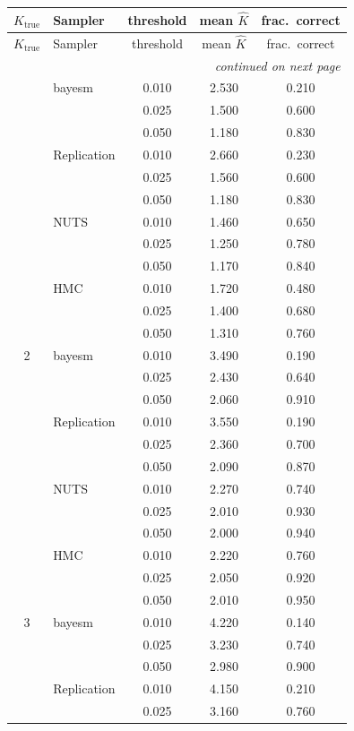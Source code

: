 \begin{longtable}{clccc}
\toprule
$K_{\text{true}}$ & Sampler & threshold & mean $\hat K$ & frac.\ correct \\
\midrule
\endfirsthead
\toprule
$K_{\text{true}}$ & Sampler & threshold & mean $\hat K$ & frac.\ correct \\
\midrule
\endhead
\midrule
\multicolumn{5}{r}{\emph{continued on next page}} \\
\endfoot
\bottomrule
\endlastfoot
1 & bayesm & 0.010 & 2.530 & 0.210 \\
 &  & 0.025 & 1.500 & 0.600 \\
 &  & 0.050 & 1.180 & 0.830 \\
 & Replication & 0.010 & 2.660 & 0.230 \\
 &  & 0.025 & 1.560 & 0.600 \\
 &  & 0.050 & 1.180 & 0.830 \\
 & NUTS & 0.010 & 1.460 & 0.650 \\
 &  & 0.025 & 1.250 & 0.780 \\
 &  & 0.050 & 1.170 & 0.840 \\
 & HMC & 0.010 & 1.720 & 0.480 \\
 &  & 0.025 & 1.400 & 0.680 \\
 &  & 0.050 & 1.310 & 0.760 \\
2 & bayesm & 0.010 & 3.490 & 0.190 \\
 &  & 0.025 & 2.430 & 0.640 \\
 &  & 0.050 & 2.060 & 0.910 \\
 & Replication & 0.010 & 3.550 & 0.190 \\
 &  & 0.025 & 2.360 & 0.700 \\
 &  & 0.050 & 2.090 & 0.870 \\
 & NUTS & 0.010 & 2.270 & 0.740 \\
 &  & 0.025 & 2.010 & 0.930 \\
 &  & 0.050 & 2.000 & 0.940 \\
 & HMC & 0.010 & 2.220 & 0.760 \\
 &  & 0.025 & 2.050 & 0.920 \\
 &  & 0.050 & 2.010 & 0.950 \\
3 & bayesm & 0.010 & 4.220 & 0.140 \\
 &  & 0.025 & 3.230 & 0.740 \\
 &  & 0.050 & 2.980 & 0.900 \\
 & Replication & 0.010 & 4.150 & 0.210 \\
 &  & 0.025 & 3.160 & 0.760 \\

\end{longtable}
